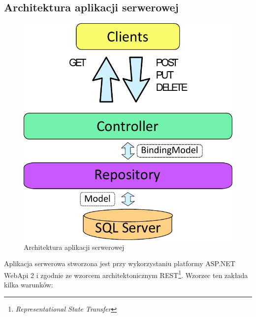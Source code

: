 \documentclass{book}
\begin{document}
			\subsection{Architektura aplikacji serwerowej}
			
			\begin{figure}
				\centering
				\includegraphics[width=1\textwidth]{architektura_server.pdf}
				\caption{Architektura aplikacji serwerowej}
				\label{fig:architektura_server}
			\end{figure}
			
			Aplikacja serwerowa stworzona jest przy wykorzystaniu platformy ASP.NET WebApi 2 i zgodnie ze wzorcem architektonicznym REST\footnote{\emph{Representational State Transfer}}. Wzorzec ten zakłada kilka warunków:
			
\end{document}
